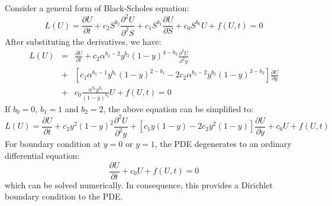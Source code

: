 \documentclass[12pt]{article}
\begin{document}
Consider a general form of Black-Scholes equation:
\begin{equation*}
L(U) = \frac{\partial U}{\partial t} + c_2S^{b_2}\frac{\partial^2U}{\partial^2S} + c_1S^{b_1}\frac{\partial U}{\partial S} + c_0S^{b_0}U + f(U,t) = 0
\end{equation*}
After substituting the derivatives, we have:
\begin{eqnarray*}
L(U) &= &\frac{\partial U}{\partial t} + c_2\alpha^{b_2-2}y^{b_2}(1-y)^{4-b_2}\frac{\partial^2 U}{\partial^2 y} \\
&+& [c_1\alpha^{b_1-1}y^{b_1}(1-y)^{2-b_1} - 2c_2\alpha^{b_2-2}y^{b_2}(1-y)^{3-b_2}]\frac{\partial U}{\partial y} \\
&+& c_0\frac{\alpha^{b_0}y^{b_0}}{(1-y)^{b_0}}U + f(U,t) = 0
\end{eqnarray*}
If $b_0 = 0$, $b_1 = 1$ and $b_2 = 2$, the above equation can be simplified to:
\begin{equation}
L(U) = \frac{\partial U}{\partial t} + c_2y^2(1-y)^2\frac{\partial^2U}{\partial^2y} + [c_1y(1-y) - 2c_2y^2(1-y)]\frac{\partial U}{\partial y} + c_0U + f(U, t)
\end{equation}
For boundary condition at $y = 0$ or $y = 1$, the PDE degenerates to an ordinary differential equation:
\begin{equation}
\frac{\partial U}{\partial t} + c_0U + f(U, t) = 0
\end{equation}
which can be solved numerically. In consequence, this provides a Dirichlet boundary condition to the PDE.
\end{document}
